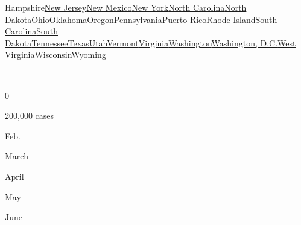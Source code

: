 {Hampshire}\href{https://www.nytimes.com/interactive/2020/us/new-jersey-coronavirus-cases.html}{New
Jersey}\href{https://www.nytimes.com/interactive/2020/us/new-mexico-coronavirus-cases.html}{New
Mexico}\href{https://www.nytimes.com/interactive/2020/us/new-york-coronavirus-cases.html}{New
York}\href{https://www.nytimes.com/interactive/2020/us/north-carolina-coronavirus-cases.html}{North
Carolina}\href{https://www.nytimes.com/interactive/2020/us/north-dakota-coronavirus-cases.html}{North
Dakota}\href{https://www.nytimes.com/interactive/2020/us/ohio-coronavirus-cases.html}{Ohio}\href{https://www.nytimes.com/interactive/2020/us/oklahoma-coronavirus-cases.html}{Oklahoma}\href{https://www.nytimes.com/interactive/2020/us/oregon-coronavirus-cases.html}{Oregon}\href{https://www.nytimes.com/interactive/2020/us/pennsylvania-coronavirus-cases.html}{Pennsylvania}\href{https://www.nytimes.com/interactive/2020/us/puerto-rico-coronavirus-cases.html}{Puerto
Rico}\href{https://www.nytimes.com/interactive/2020/us/rhode-island-coronavirus-cases.html}{Rhode
Island}\href{https://www.nytimes.com/interactive/2020/us/south-carolina-coronavirus-cases.html}{South
Carolina}\href{https://www.nytimes.com/interactive/2020/us/south-dakota-coronavirus-cases.html}{South
Dakota}\href{https://www.nytimes.com/interactive/2020/us/tennessee-coronavirus-cases.html}{Tennessee}\href{https://www.nytimes.com/interactive/2020/us/texas-coronavirus-cases.html}{Texas}\href{https://www.nytimes.com/interactive/2020/us/utah-coronavirus-cases.html}{Utah}\href{https://www.nytimes.com/interactive/2020/us/vermont-coronavirus-cases.html}{Vermont}\href{https://www.nytimes.com/interactive/2020/us/virginia-coronavirus-cases.html}{Virginia}\href{https://www.nytimes.com/interactive/2020/us/washington-coronavirus-cases.html}{Washington}\href{https://www.nytimes.com/interactive/2020/us/washington-dc-coronavirus-cases.html}{Washington,
D.C.}\href{https://www.nytimes.com/interactive/2020/us/west-virginia-coronavirus-cases.html}{West
Virginia}\href{https://www.nytimes.com/interactive/2020/us/wisconsin-coronavirus-cases.html}{Wisconsin}\href{https://www.nytimes.com/interactive/2020/us/wyoming-coronavirus-cases.html}{Wyoming}

~

0

200,000 cases

Feb.

March

April

May

June

